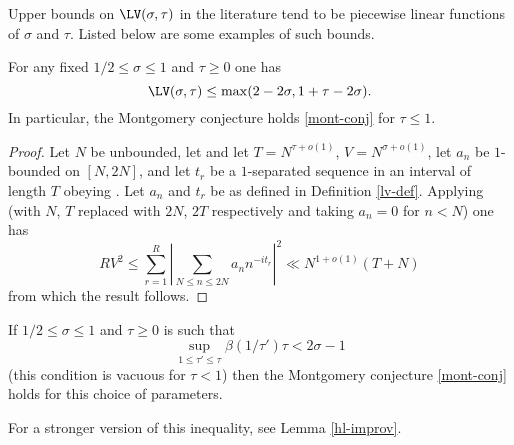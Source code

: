 Upper bounds on $\LV(\sigma,\tau)$ in the literature tend to be piecewise linear functions of $\sigma$ and $\tau$.  Listed below are some examples of such bounds.

\begin{theorem}\label{l2-mvt} For any fixed $1/2 \leq \sigma \leq 1$ and $\tau\geq 0$ one has
    $$ \LV(\sigma,\tau) \leq \max( 2-2\sigma, 1 + \tau - 2 \sigma).$$
In particular, the Montgomery conjecture holds \eqref{mont-conj} for $\tau \leq 1$.
\end{theorem}


\begin{proof}
Let $N$ be unbounded, let  and let $T = N^{\tau + o(1)}$, $V = N^{\sigma + o(1)}$, let $a_n$ be $1$-bounded on $[N,2N]$, and let $t_r$ be a $1$-separated sequence in an interval of length $T$ obeying . Let $a_n$ and $t_r$ be as defined in Definition \ref{lv-def}. Applying \cite[Theorem~9.4]{ik} (with $N$, $T$ replaced with $2N$, $2T$ respectively and taking $a_n = 0$ for $n < N$) one has
\[
RV^2 \le \sum_{r = 1}^R\left|\sum_{N \le n \le 2N} a_n n^{-it_r}\right|^2 \ll N^{1 + o(1)}(T + N)
\]
from which the result follows. 
\end{proof}

\begin{theorem}\label{montgomery-lv} If $1/2 \leq \sigma \leq 1$ and $\tau \geq 0$ is such that
\begin{equation}\label{tab}   
\sup_{1 \leq \tau' \leq \tau} \beta(1/\tau') \tau < 2\sigma - 1
\end{equation}
(this condition is vacuous for $\tau < 1$) then the Montgomery conjecture \eqref{mont-conj} holds for this choice of parameters. 
\end{theorem}

For a stronger version of this inequality, see Lemma \ref{hl-improv}.


